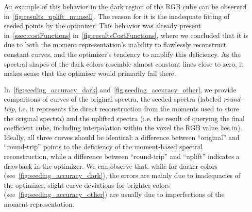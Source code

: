 An example of this behavior in the dark region of the RGB cube can be observed in~\cref{fig:results_uplift_munsell}. The reason for it is the inadequate fitting of seeded points by the optimizer. This behavior was already present in~\cref{ssec:costFunctions} in~\cref{fig:resultsCostFunctions}, where we concluded that it is due to both the moment representation's inability to flawlessly reconstruct constant curves, and the optimizer's tendency to amplify this deficiency. As the spectral shapes of the dark colors resemble almost constant lines close to zero, it makes sense that the optimiser would primarily fail there.

In~\cref{fig:seeding_accuracy_dark} and~\cref{fig:seeding_accuracy_other}, we provide comparisons of curves of the original spectra, the seeded spectra (labeled \emph{round-trip}, i.e. it represents the direct reconstruction from the moments used to store the original spectra) and the uplifted spectra (i.e. the result of querying the final coefficient cube, including interpolation within the voxel the RGB value lies in). Ideally, all three curves should be identical: a difference between ``original'' and ``round-trip'' points to the deficiency of the moment-based spectral reconstruction, while a difference between ``round-trip'' and ``uplift'' indicates a drawback in the optimizer. We can observe that, while for darker colors (see~\cref{fig:seeding_accuracy_dark}), the errors are mainly due to inadequacies of the optimizer, slight curve deviations for brighter colors (see~\cref{fig:seeding_accuracy_other}) are usually due to imperfections of the moment representation.

